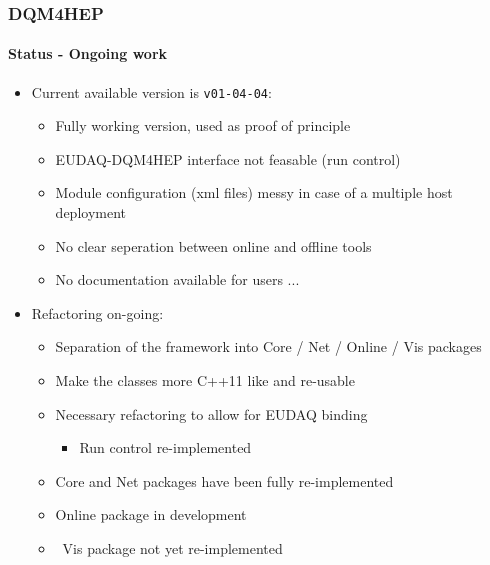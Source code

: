 \documentclass[presentation, 10pt]{beamer}
\begin{document}
\begin{frame}
  \frametitle{DQM4HEP}
  \framesubtitle{Status - Ongoing work}
  \footnotesize
  \begin{itemize}
    \scriptsize
    \item Current available version is \texttt{v01-04-04}:
    \begin{itemize}
      \scriptsize
      \item Fully working version, used as proof of principle
      \item EUDAQ-DQM4HEP interface not feasable (run control)
      \item Module configuration (xml files) messy in case of a multiple host deployment
      \item No clear seperation between online and offline tools
      \item No documentation available for users ...
    \end{itemize}
    \pause
    \item Refactoring on-going:
    \begin{itemize}
      \scriptsize
      \item \textcolor{green}{\checkmark} Separation of the framework into Core / Net / Online / Vis packages
      \item \textcolor{green}{\checkmark} Make the classes more C++11 like and re-usable
      \item Necessary refactoring to allow for EUDAQ binding
      \begin{itemize}
        \scriptsize
        \item \textcolor{green}{\checkmark} Run control re-implemented 
      \end{itemize}
      \item \textcolor{green}{\checkmark} Core and Net packages have been fully re-implemented
      \item \textcolor{blue}{} Online package in development
      \item \textcolor{red}{} ~Vis package not yet re-implemented
    \end{itemize}
  \end{itemize}
  
\end{frame}
\end{document}

